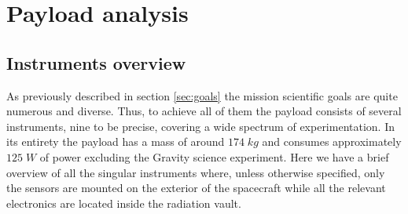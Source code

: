 \section{Payload analysis}
\label{sec:payload}

\subsection{Instruments overview}
As previously described in section \ref{sec:goals} the mission scientific goals are quite numerous and diverse. Thus, to achieve all of them the payload consists of several instruments, nine to be precise, covering a wide spectrum of experimentation. In its entirety the payload has a mass of around $174 \;kg$ and consumes approximately $125 \;W$ of power excluding the Gravity science experiment. %
Here we have a brief overview of all the singular instruments where, unless otherwise specified, only the sensors are mounted on the exterior of the spacecraft while all the relevant electronics are located inside the radiation vault. 

